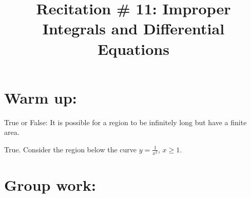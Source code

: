 \documentclass[noinstructornotes]{ximera}
\title{Recitation \# 11: Improper Integrals and Differential Equations}
\begin{document}
\begin{abstract}		\end{abstract}
\maketitle




\section{Warm up:}
True or False:  It is possible for a region to be infinitely long but have a finite area.
	\begin{freeResponse}
	True.  Consider the region below the curve $y=\frac{1}{x^2}$, $x \geq 1$.
	\end{freeResponse}
	
\begin{instructorNotes}

\end{instructorNotes}





\section{Group work:}
\end{document}

